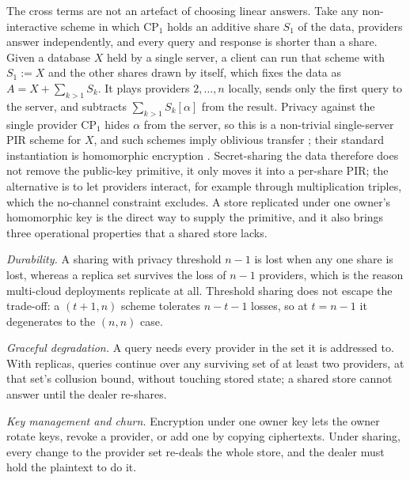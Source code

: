 \documentclass[a4paper,fleqn]{cas-dc}
\begin{document}
The cross terms are not an artefact of choosing linear answers. Take any
non-interactive scheme in which $\text{CP}_1$ holds an additive share $S_1$ of
the data, providers answer independently, and every query and response is
shorter than a share. Given a database $X$ held by a single server, a client
can run that scheme with $S_1:=X$ and the other shares drawn by itself, which
fixes the data as $A=X+\sum_{k>1}S_k$. It plays providers $2,\dots,n$ locally,
sends only the first query to the server, and subtracts $\sum_{k>1}S_k[\alpha]$
from the result. Privacy against the single provider $\text{CP}_1$ hides
$\alpha$ from the server, so this is a non-trivial single-server PIR scheme for
$X$, and such schemes imply oblivious transfer \citep{dicrescenzo2000single};
their standard instantiation is homomorphic encryption
\citep{kushilevitz1997replication}. Secret-sharing the data therefore does not
remove the public-key primitive, it only moves it into a per-share PIR; the
alternative is to let providers interact, for example through multiplication
triples, which the no-channel constraint excludes. A store replicated under one
owner's homomorphic key is the direct way to supply the primitive, and it also
brings three operational properties that a shared store lacks.

\emph{Durability.} A sharing with privacy threshold $n-1$ is lost when any one
share is lost, whereas a replica set survives the loss of $n-1$ providers,
which is the reason multi-cloud deployments replicate at all. Threshold
sharing does not escape the trade-off: a $(t{+}1,n)$ scheme tolerates
$n-t-1$ losses, so at $t=n-1$ it degenerates to the $(n,n)$ case.

\emph{Graceful degradation.} A query needs every provider in the set it is
addressed to. With replicas, queries continue over any surviving set of at
least two providers, at that set's collusion bound, without touching stored
state; a shared store cannot answer until the dealer re-shares.

\emph{Key management and churn.} Encryption under one owner key lets the owner
rotate keys, revoke a provider, or add one by copying ciphertexts. Under
sharing, every change to the provider set re-deals the whole store, and the
dealer must hold the plaintext to do it.
\end{document}
